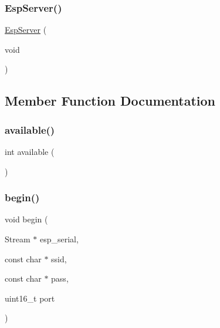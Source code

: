 \subsubsection{\texorpdfstring{Esp\+Server()}{EspServer()}}
{\footnotesize\ttfamily \mbox{\hyperlink{class_esp_server}{Esp\+Server}} (\begin{DoxyParamCaption}\item[{void}]{ }\end{DoxyParamCaption})}



\subsection{Member Function Documentation}
\mbox{\label{class_esp_server_a4549a76725f2e4c013e4d57018366109}} 
\subsubsection{\texorpdfstring{available()}{available()}}
{\footnotesize\ttfamily int available (\begin{DoxyParamCaption}{ }\end{DoxyParamCaption})\hspace{0.3cm}{\ttfamily [virtual]}}

\mbox{\label{class_esp_server_a1d8682ca0934af03639311e23a71283f}} 
\subsubsection{\texorpdfstring{begin()}{begin()}}
{\footnotesize\ttfamily void begin (\begin{DoxyParamCaption}\item[{Stream $\ast$}]{esp\+\_\+serial,  }\item[{const char $\ast$}]{ssid,  }\item[{const char $\ast$}]{pass,  }\item[{uint16\+\_\+t}]{port }\end{DoxyParamCaption})}

\mbox{\label{class_esp_server_a59fc494d53391b27e2fd75cb750690d9}} 
